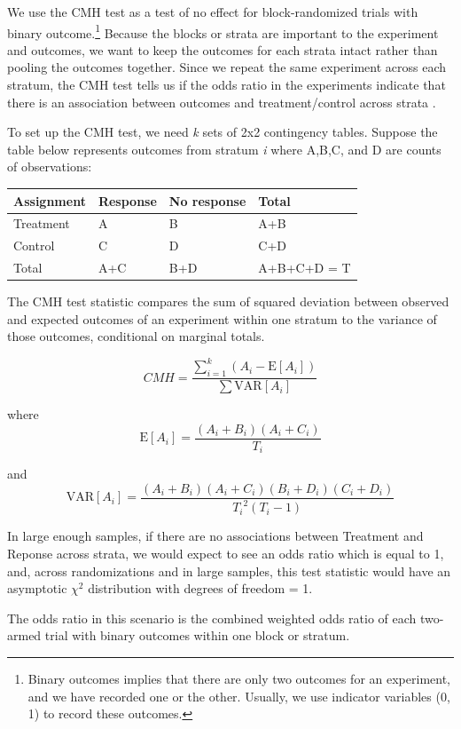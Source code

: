 \documentclass[
  12pt,
]{book}
\theoremstyle{definition}
\theoremstyle{definition}
\theoremstyle{definition}
\theoremstyle{remark}
\begin{document}
We use the CMH test as a test of no effect for block-randomized trials
with binary outcome.\footnote{Binary outcomes implies that there are
  only two outcomes for an experiment, and we have recorded one or the
  other. Usually, we use indicator variables (0, 1) to record these
  outcomes.} Because the blocks or strata are important to the
experiment and outcomes, we want to keep the outcomes for each strata
intact rather than pooling the outcomes together. Since we repeat the
same experiment across each stratum, the CMH test tells us if the odds
ratio in the experiments indicate that there is an association between
outcomes and treatment/control across strata
\citep{cochran_methods_1954, mantel_statistical_1959}.

To set up the CMH test, we need \emph{k} sets of 2x2 contingency tables.
Suppose the table below represents outcomes from stratum \emph{i} where
A,B,C, and D are counts of observations:

\begin{longtable}[]{@{}llll@{}}
\toprule()
Assignment & Response & No response & Total \\
\midrule()
\endhead
Treatment & A & B & A+B \\
Control & C & D & C+D \\
Total & A+C & B+D & A+B+C+D = T \\
\bottomrule()
\end{longtable}

The CMH test statistic compares the sum of squared deviation between
observed and expected outcomes of an experiment within one stratum to
the variance of those outcomes, conditional on marginal totals.

\[CMH = \frac{\sum_{i=1}^{k} (A_{i} -
\mathrm{E}[{A_{i}}])}{\sum{\mathrm{VAR}[{A_i}]}}\]

where \[\mathrm{E}[A_{i}] =  \frac{(A_i+B_i)(A_i+C_i)}{T_i}\]

and \[\mathrm{VAR}[A_{i}] =
\frac{(A_i+B_i)(A_i+C_i)(B_i+D_i)(C_i+D_i)}{{T_i}^2(T_i-1)}\]

In large enough samples, if there are no associations between Treatment
and Reponse across strata, we would expect to see an odds ratio which is
equal to 1, and, across randomizations and in large samples, this test
statistic would have an asymptotic \(\chi^2\) distribution with degrees
of freedom = 1.

The odds ratio in this scenario is the combined weighted odds ratio of
each two-armed trial with binary outcomes within one block or stratum.
\end{document}
